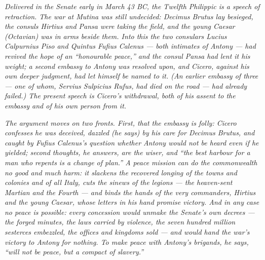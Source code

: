 
\textit{Delivered in the Senate early in March 43 BC, the Twelfth
Philippic is a speech of retraction. The war at Mutina was still
undecided: Decimus Brutus lay besieged, the consuls Hirtius and
Pansa were taking the field, and the young Caesar (Octavian) was in
arms beside them. Into this the two consulars Lucius Calpurnius Piso
and Quintus Fufius Calenus --- both intimates of Antony --- had
revived the hope of an ``honourable peace,'' and the consul Pansa
had lent it his weight; a second embassy to Antony was resolved upon,
and Cicero, against his own deeper judgment, had let himself be named
to it. (An earlier embassy of three --- one of whom, Servius
Sulpicius Rufus, had died on the road --- had already failed.) The
present speech is Cicero's withdrawal, both of his assent to the
embassy and of his own person from it.}

\textit{The argument moves on two fronts. First, that the embassy is
folly: Cicero confesses he was deceived, dazzled (he says) by his
care for Decimus Brutus, and caught by Fufius Calenus's question
whether Antony would not be heard even if he yielded; second
thoughts, he answers, are the wiser, and ``the best harbour for a man
who repents is a change of plan.'' A peace mission can do the
commonwealth no good and much harm: it slackens the recovered
longing of the towns and colonies and of all Italy, cuts the sinews
of the legions --- the heaven-sent Martian and the Fourth --- and
binds the hands of the very commanders, Hirtius and the young Caesar,
whose letters in his hand promise victory. And in any case no peace
is possible: every concession would unmake the Senate's own decrees
--- the forged minutes, the laws carried by violence, the seven
hundred million sesterces embezzled, the offices and kingdoms sold
--- and would hand the war's victory to Antony for nothing. To make
peace with Antony's brigands, he says, ``will not be peace, but a
compact of slavery.''}

